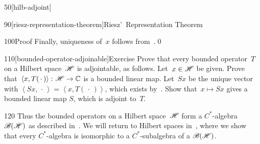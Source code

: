 \begin{parsec}{50}[hilb-adjoint]
\begin{point}{90}[riesz-representation-theorem]{Riesz'~Representation Theorem}
\begin{point}{100}{Proof}
Finally, uniqueness of~$x$ follows from~.\qed
\end{point}
\end{point}
\begin{point}{110}[bounded-operator-adjoinable]{Exercise}%
Prove that every bounded operator~$T$ on a Hilbert space~$\mathscr{H}$
is adjointable, as follows.
Let~$x\in \mathscr{H}$ be given.
Prove that~$\left<x,T(\,\cdot\,)\right>\colon \mathscr{H}\to \mathbb{C}$
is a bounded linear map.
Let~$Sx$ be the unique vector with $\left<Sx,\,\cdot\,\right>
=\left<x,T(\,\cdot\,)\right>$,
which exists by~.
Show that~$x\mapsto Sx$
gives a bounded linear map $S$, which is adjoint to~$T$.
\end{point}
\begin{point}{120}%
Thus the bounded operators
on a Hilbert space~$\mathscr{H}$
form a $C^*$-algebra~$\mathscr{B}(\mathscr{H})$%
as described in~.
We will return to Hilbert spaces
in~,
where we show that every $C^*$-algebra
is isomorphic to a $C^*$-subalgebra of
a $\mathscr{B}(\mathscr{H})$.
\end{point}
\end{parsec}
